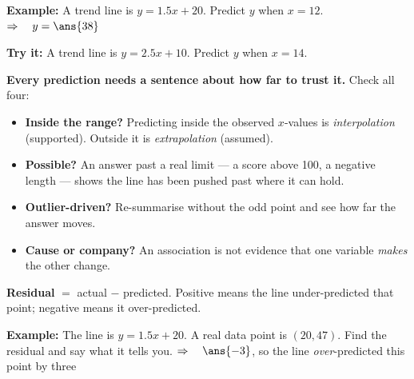 \documentclass[12pt]{article}
\begin{document}
\begin{examplebox}
\textbf{Example:} \quad A trend line is $y = 1.5x + 20$. Predict $y$ when $x = 12$.
$\Rightarrow\quad y = \ans{38}$
\end{examplebox}

\begin{tryitbox}
\textbf{Try it:} \quad A trend line is $y = 2.5x + 10$. Predict $y$ when $x = 14$.\\[2pt]
\end{tryitbox}


\begin{formulabox}
\textbf{Every prediction needs a sentence about how far to trust it.} Check all four:
\begin{itemize}[label={$\bullet$}, leftmargin=1.1cm, itemsep=1pt, topsep=2pt]
  \item \textbf{Inside the range?} Predicting inside the observed $x$-values is
        \emph{interpolation} (supported). Outside it is \emph{extrapolation} (assumed).
  \item \textbf{Possible?} An answer past a real limit --- a score above 100, a negative
        length --- shows the line has been pushed past where it can hold.
  \item \textbf{Outlier-driven?} Re-summarise without the odd point and see how far the
        answer moves.
  \item \textbf{Cause or company?} An association is not evidence that one variable
        \emph{makes} the other change.
\end{itemize}
\textbf{Residual} $=$ actual $-$ predicted. Positive means the line under-predicted that
point; negative means it over-predicted.
\end{formulabox}

\begin{examplebox}
\textbf{Example:} \quad The line is $y = 1.5x + 20$. A real data point is $(20, 47)$. Find
the residual and say what it tells you.
$\Rightarrow\quad \ans{-3}$, so the line \emph{over}-predicted this point by three
\end{examplebox}
\end{document}

